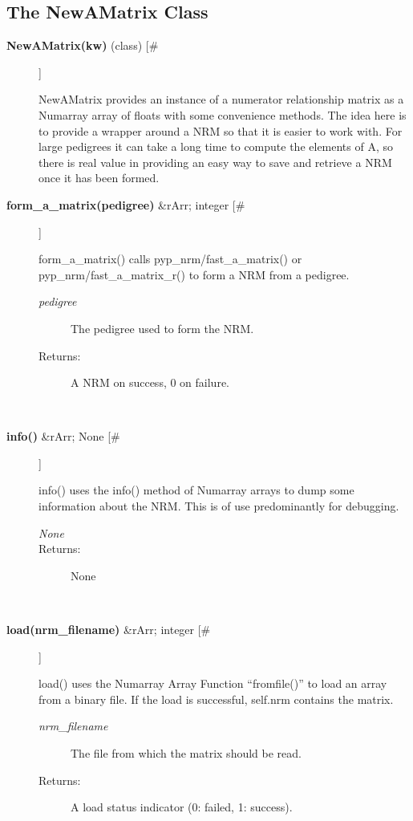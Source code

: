 \subsection*{The NewAMatrix Class}
\begin{description}
\item[\textbf{NewAMatrix(kw)}
 (class) [\#]]

 NewAMatrix provides an instance of a numerator relationship matrix as a Numarray array of floats with some convenience methods. The idea here is to provide a wrapper around a NRM so that it is easier to work with. For large pedigrees it can take a long time to compute the elements of A, so there is real value in providing an easy way to save and retrieve a NRM once it has been formed.

\item[\textbf{form\_a\_matrix(pedigree)}
 \&rArr; integer [\#]]

 form\_a\_matrix() calls pyp\_nrm/fast\_a\_matrix() or pyp\_nrm/fast\_a\_matrix\_r() to form a NRM from a pedigree.
\begin{description}
\item[\emph{pedigree}
] The pedigree used to form the NRM.
\item[Returns:] A NRM on success, 0 on failure.

\end{description}
\\ 

\item[\textbf{info()}
 \&rArr; None [\#]]

 info() uses the info() method of Numarray arrays to dump some information about the NRM. This is of use predominantly for debugging.
\begin{description}
\item[\emph{None}
]
\item[Returns:] None

\end{description}
\\ 

\item[\textbf{load(nrm\_filename)}
 \&rArr; integer [\#]]

 load() uses the Numarray Array Function ``fromfile()'' to load an array from a binary file. If the load is successful, self.nrm contains the matrix.
\begin{description}
\item[\emph{nrm\_filename}
] The file from which the matrix should be read.
\item[Returns:] A load status indicator (0: failed, 1: success).


\end{description}
\end{description}
